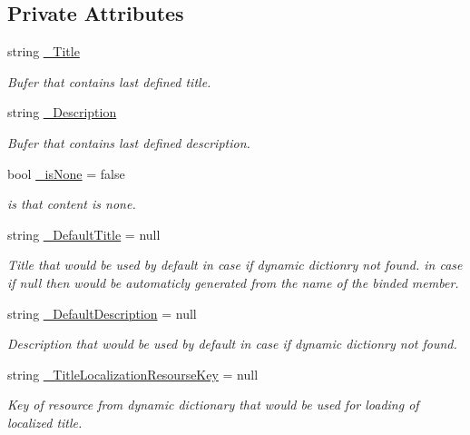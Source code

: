 \subsection*{Private Attributes}
\begin{DoxyCompactItemize}
\item 
string \mbox{\hyperlink{class_wpf_handler_1_1_u_i_1_1_g_u_i_content_af02b5c5e573d3bb9a92dfd9063690d1d}{\+\_\+\+Title}}
\begin{DoxyCompactList}\small\item\em Bufer that contains last defined title. \end{DoxyCompactList}\item 
string \mbox{\hyperlink{class_wpf_handler_1_1_u_i_1_1_g_u_i_content_a2589ade8a7b670ed7091b7c658863bb7}{\+\_\+\+Description}}
\begin{DoxyCompactList}\small\item\em Bufer that contains last defined description. \end{DoxyCompactList}\item 
bool \mbox{\hyperlink{class_wpf_handler_1_1_u_i_1_1_g_u_i_content_afffba81fad8d7a802ec0f55a6c8b9da7}{\+\_\+is\+None}} = false
\begin{DoxyCompactList}\small\item\em is that content is none. \end{DoxyCompactList}\item 
string \mbox{\hyperlink{class_wpf_handler_1_1_u_i_1_1_g_u_i_content_a7bfdcdd062eaf3f8cadcdb34eed52d2f}{\+\_\+\+Default\+Title}} = null
\begin{DoxyCompactList}\small\item\em Title that would be used by default in case if dynamic dictionry not found. in case if null then would be automaticly generated from the name of the binded member. \end{DoxyCompactList}\item 
string \mbox{\hyperlink{class_wpf_handler_1_1_u_i_1_1_g_u_i_content_a7d0ce7f98f08a7e1373eb150231d0c56}{\+\_\+\+Default\+Description}} = null
\begin{DoxyCompactList}\small\item\em Description that would be used by default in case if dynamic dictionry not found. \end{DoxyCompactList}\item 
string \mbox{\hyperlink{class_wpf_handler_1_1_u_i_1_1_g_u_i_content_ac878075c0d59c6ce0c7b54a82b5843c8}{\+\_\+\+Title\+Localization\+Resourse\+Key}} = null
\begin{DoxyCompactList}\small\item\em Key of resource from dynamic dictionary that would be used for loading of localized title. \end{DoxyCompactList}\item 

\end{DoxyCompactItemize}
